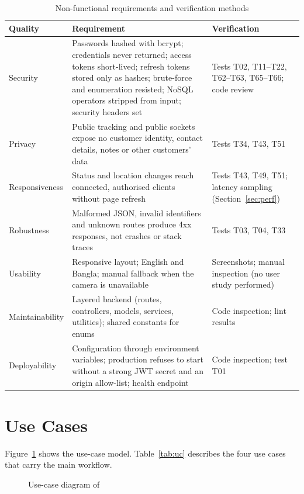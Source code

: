 \begin{table}[htbp]
\centering
\caption{Non-functional requirements and verification methods}
\label{tab:nfr}
\small
\begin{tabularx}{\textwidth}{@{}P{2.2cm}LP{3.6cm}@{}}
\toprule
\textbf{Quality} & \textbf{Requirement} & \textbf{Verification} \\
\midrule
Security & Passwords hashed with bcrypt; credentials never returned; access tokens short-lived; refresh tokens stored only as hashes; brute-force and enumeration resisted; NoSQL operators stripped from input; security headers set & Tests T02, T11--T22, T62--T63, T65--T66; code review \\
Privacy & Public tracking and public sockets expose no customer identity, contact details, notes or other customers' data & Tests T34, T43, T51 \\
Responsiveness & Status and location changes reach connected, authorised clients without page refresh & Tests T43, T49, T51; latency sampling (Section~\ref{sec:perf}) \\
Robustness & Malformed JSON, invalid identifiers and unknown routes produce 4xx responses, not crashes or stack traces & Tests T03, T04, T33 \\
Usability & Responsive layout; English and Bangla; manual fallback when the camera is unavailable & Screenshots; manual inspection (no user study performed) \\
Maintainability & Layered backend (routes, controllers, models, services, utilities); shared constants for enums & Code inspection; lint results \\
Deployability & Configuration through environment variables; production refuses to start without a strong JWT secret and an origin allow-list; health endpoint & Code inspection; test T01 \\
\bottomrule
\end{tabularx}
\end{table}

\section{Use Cases}
\label{sec:usecases}

Figure~\ref{fig:usecase} shows the use-case model. Table~\ref{tab:uc} describes the four use cases that carry the main workflow.

\begin{figure}[htbp]
\centering
\resizebox{0.92\textwidth}{!}{}
\caption{Use-case diagram of \scpms}
\label{fig:usecase}
\end{figure}


